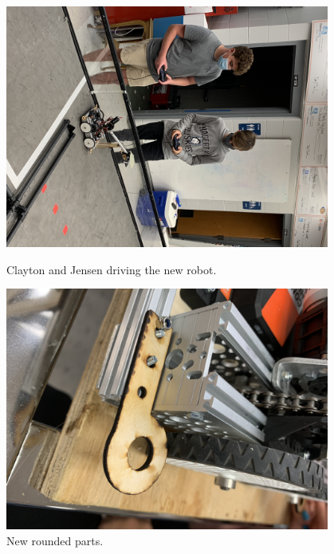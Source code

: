 \begin{figure}[ht]
\centering
\begin{minipage}[b]{.48\textwidth}
  \centering
  \includegraphics[width=0.95\textwidth]{Meetings/October/10-12-21/10-12-21_Team_Figure1 - Nathan Forrer.JPG}
  \caption{Clayton and Jensen driving the new robot.}
  \label{fig:101221_1}
\end{minipage}%
\hfill%
\begin{minipage}[b]{.48\textwidth}
  \centering
  \includegraphics[width=0.95\textwidth]{Meetings/October/10-12-21/10-12-21_Team_Figure2 - Nathan Forrer.JPG}
  \caption{New rounded parts.}
  \label{fig:101221_2}
\end{minipage}
\end{figure}

